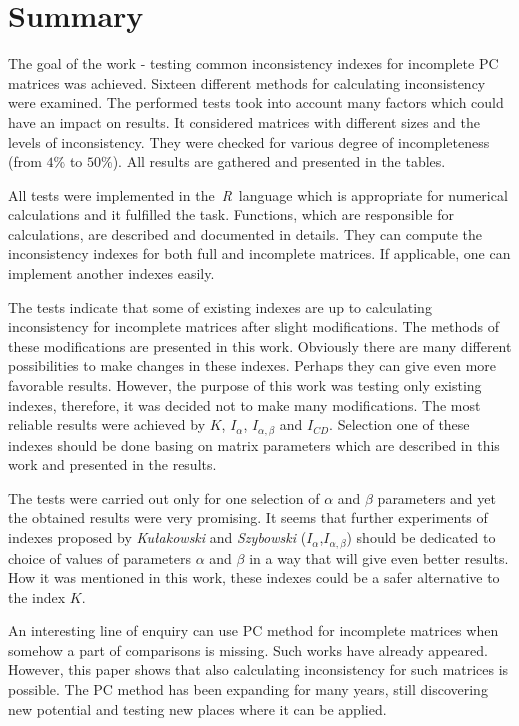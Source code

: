 \chapter{Summary}
\label{sec:summary}

The goal of the work - testing common inconsistency indexes for incomplete PC matrices was achieved. Sixteen different methods for calculating inconsistency were examined. The performed tests took into account many factors which could have an impact on results. It considered matrices with different sizes and the levels of inconsistency. They were checked for various degree of incompleteness (from $4\%$ to $50\%$). All results are gathered and presented in the tables.

All tests were implemented in the~\textit{R}~language which is appropriate for numerical calculations and it fulfilled the task. Functions, which are responsible for calculations, are described and documented in details. They can compute the inconsistency indexes for both full and incomplete matrices. If applicable, one can implement another indexes easily.

The tests indicate that some of existing indexes are up to calculating inconsistency for incomplete matrices after slight modifications. The methods of these modifications are presented in this work. Obviously there are many different possibilities to make changes in these indexes. Perhaps they can give even more favorable results. However, the purpose of this work was testing only existing indexes, therefore, it was decided not to make many modifications. The most reliable results were achieved by $K$, $I_{\alpha}$, $I_{\alpha,\beta}$ and $I_{CD}$. Selection one of these indexes should be done basing on matrix parameters which are described in this work and presented in the results.

The tests were carried out only for one selection of $\alpha$ and $\beta$ parameters and yet the obtained results were very promising. It seems that further experiments of indexes proposed by \textit{Kułakowski} and \textit{Szybowski} ($I_{\alpha}$,$I_{\alpha,\beta}$) should be dedicated to choice of values of parameters $\alpha$ and $\beta$ in a way that will give even better results. How it was mentioned in this work, these indexes could be a safer alternative to the index $K$.

An interesting line of enquiry can use PC method for incomplete matrices when somehow a part of comparisons is missing. Such works have already appeared. However, this paper shows that also calculating inconsistency for such matrices is possible. The PC method has been expanding for many years, still discovering new potential and testing new places where it can be applied.